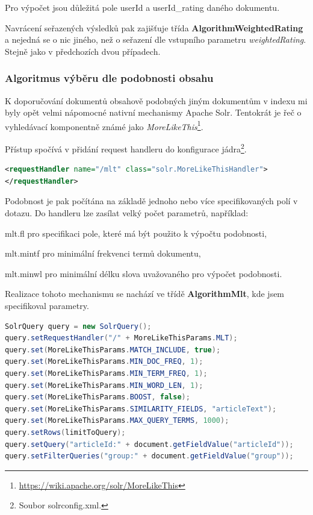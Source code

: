 \documentclass[thesis=M,czech]{FITthesis}[2014/05/07]
\begin{document}
Pro výpočet jsou důležitá pole userId a userId\_rating daného dokumentu.

Navrácení seřazených výsledků pak zajišťuje třída \textbf{AlgorithmWeightedRating} a nejedná se o nic jiného, než o seřazení dle vstupního parametru \emph{weightedRating}. Stejně jako v předchozích dvou případech.

\subsubsection{Algoritmus výběru dle podobnosti obsahu}
K doporučování dokumentů obsahově podobných jiným dokumentům v indexu mi byly opět velmi nápomocné nativní mechanismy Apache Solr. Tentokrát je řeč o vyhledávací komponentně známé jako \emph{MoreLikeThis}\footnote{\url{https://wiki.apache.org/solr/MoreLikeThis}}.

Přístup spočívá v přidání request handleru do konfigurace jádra\footnote{Soubor solrconfig.xml.}.

\begin{lstlisting}[language=xml]
<requestHandler name="/mlt" class="solr.MoreLikeThisHandler">
</requestHandler>
\end{lstlisting}

Podobnost je pak počítána na základě jednoho nebo více specifikovaných polí v dotazu. Do handleru lze zasílat velký počet parametrů, například:

\begin{description}
	\item mlt.fl pro specifikaci pole, které má být použito k výpočtu podobnosti,
	\item mlt.mintf pro minimální frekvenci termů dokumentu,
	\item mlt.minwl pro minimální délku slova uvažovaného pro výpočet podobnosti.
\end{description}

Realizace tohoto mechanismu se nachází ve třídě \textbf{AlgorithmMlt}, kde jsem specifikoval parametry. 

\begin{lstlisting}[language=java]
SolrQuery query = new SolrQuery();
query.setRequestHandler("/" + MoreLikeThisParams.MLT);
query.set(MoreLikeThisParams.MATCH_INCLUDE, true);
query.set(MoreLikeThisParams.MIN_DOC_FREQ, 1);
query.set(MoreLikeThisParams.MIN_TERM_FREQ, 1);
query.set(MoreLikeThisParams.MIN_WORD_LEN, 1);
query.set(MoreLikeThisParams.BOOST, false);
query.set(MoreLikeThisParams.SIMILARITY_FIELDS, "articleText");
query.set(MoreLikeThisParams.MAX_QUERY_TERMS, 1000);
query.setRows(limitToQuery);
query.setQuery("articleId:" + document.getFieldValue("articleId"));
query.setFilterQueries("group:" + document.getFieldValue("group"));
\end{lstlisting}
\end{document}
